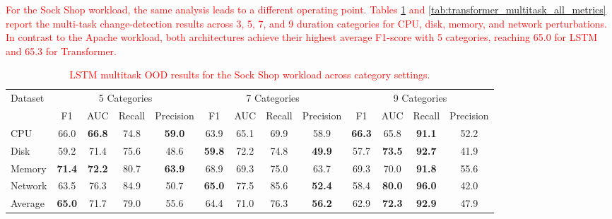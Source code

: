 \documentclass[preprint,12pt]{elsarticle}
\begin{document}
\textcolor{red}{For the Sock Shop workload, the same analysis leads to a different operating point. Tables \ref{tab:lstm_multitask_all_metrics} and \ref{tab:transformer_multitask_all_metrics} report the multi-task change-detection results across 3, 5, 7, and 9 duration categories for CPU, disk, memory, and network perturbations. In contrast to the Apache workload, both architectures achieve their highest average F1-score with 5 categories, reaching 65.0 for LSTM and 65.3 for Transformer.}

\begin{table}[tb]
\centering
\caption{\textcolor{red}{LSTM multitask OOD results for the Sock Shop workload across category settings.}}
\label{tab:lstm_multitask_all_metrics}
{\color{red}
\begin{adjustbox}{center, width=0.7\textwidth}
\begin{tabular}{|l|cccc|cccc|cccc|}
\hline
\multirow{2}{*}{Dataset}
& \multicolumn{4}{c|}{5 Categories}
& \multicolumn{4}{c|}{7 Categories}
& \multicolumn{4}{c|}{9 Categories} \\
 & F1 & AUC & Recall & Precision
 & F1 & AUC & Recall & Precision
 & F1 & AUC & Recall & Precision \\
\hline
CPU     & 66.0 & \textbf{66.8} & 74.8 & \textbf{59.0} & 63.9 & 65.1 & 69.9 & 58.9 & \textbf{66.3} & 65.8 & \textbf{91.1} & 52.2 \\
Disk    & 59.2 & 71.4 & 75.6 & 48.6 & \textbf{59.8} & 72.2 & 74.8 & \textbf{49.9} & 57.7 & \textbf{73.5} & \textbf{92.7} & 41.9 \\
Memory  & \textbf{71.4} & \textbf{72.2} & 80.7 & \textbf{63.9} & 68.9 & 69.3 & 75.0 & 63.7 & 69.3 & 70.0 & \textbf{91.8} & 55.6 \\
Network & 63.5 & 76.3 & 84.9 & 50.7 & \textbf{65.0} & 77.5 & 85.6 & \textbf{52.4} & 58.4 & \textbf{80.0} & \textbf{96.0} & 42.0 \\
\hline
Average & \textbf{65.0} & 71.7 & 79.0 & 55.6 & 64.4 & 71.0 & 76.3 & \textbf{56.2} & 62.9 & \textbf{72.3} & \textbf{92.9} & 47.9 \\
\hline
\end{tabular}
\end{adjustbox}
}
\end{table}
\end{document}
